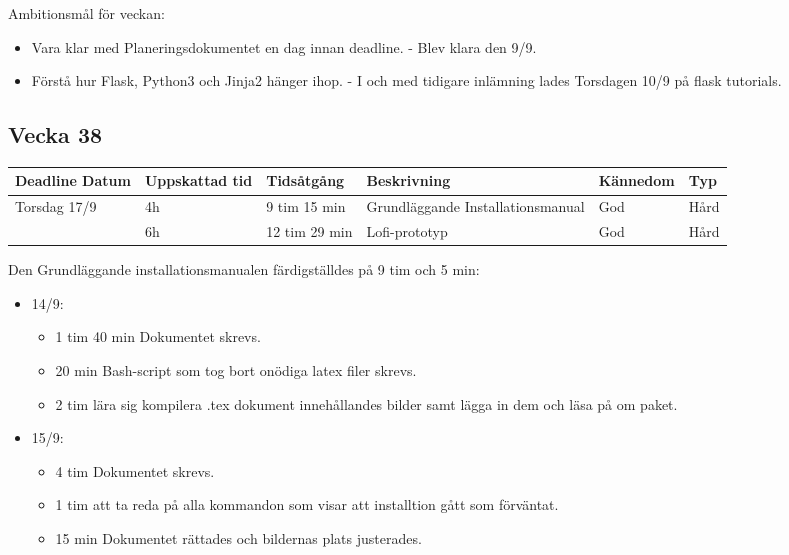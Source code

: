 \documentclass{TDP003mall}
\begin{document}
      Ambitionsmål för veckan:
      \begin{itemize}
      \item Vara klar med Planeringsdokumentet en dag innan deadline. - Blev klara den 9/9.
      \item Förstå hur Flask, Python3 och Jinja2 hänger ihop. - I och med tidigare inlämning lades Torsdagen 10/9 på flask tutorials.
      \end{itemize}
      
\subsection{Vecka 38}
\begin{tabularx}{\linewidth}{|l|l|l|X|l|l|}
	\hline
	Deadline Datum & Uppskattad tid & Tidsåtgång    & Beskrivning                       & Kännedom & Typ  \\ [0.5ex]
	\hline
	Torsdag 17/9   & 4h             & 9 tim 15 min  & Grundläggande Installationsmanual & God      & Hård \\
	\hline
                   & 6h             & 12 tim 29 min & Lofi-prototyp                     & God      & Hård \\
	\hline
\end{tabularx}

Den Grundläggande installationsmanualen färdigställdes på 9 tim och 5 min:
\begin{itemize}
	\item 14/9:
	\begin{itemize}
		\item 1 tim 40 min Dokumentet skrevs.
		\item 20 min Bash-script som tog bort onödiga latex filer skrevs.
		\item 2 tim lära sig kompilera .tex dokument innehållandes bilder samt lägga in dem och läsa på om paket.
	\end{itemize}
	\item 15/9:
	\begin{itemize}
		\item 4 tim Dokumentet skrevs.
		\item 1 tim att ta reda på alla kommandon som visar att installtion gått som förväntat.
		\item 15 min Dokumentet rättades och bildernas plats justerades.\\
	\end{itemize}
\end{itemize}
\end{document}
